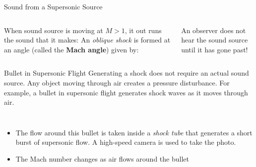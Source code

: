 \documentclass[12pt,compress,aspectratio=169]{beamer}
\begin{document}
\begin{frame}{Sound from a Supersonic Source}
  \begin{columns}
      
    When sound source is moving at $M>1$, it out runs the sound that it makes:
    An \emph{oblique shock} is formed at an angle (called the
    \textbf{Mach angle}) given by:
    

    An observer does not hear the sound source until it has gone past!
  \end{columns}
\end{frame}



\begin{frame}{Bullet in Supersonic Flight}
  Generating a shock does not require an actual sound source. Any object
  moving through air creates a pressure disturbance. For example, a bullet in
  supersonic flight generates shock waves as it moves through air.
  \begin{columns}
    \begin{itemize}
    \item The flow around this bullet is taken inside a \emph{shock tube} that
      generates a short burst of supersonic flow. A high-speed camera is used to
      take the photo.
    \item The Mach number changes as air flows around the bullet
    \end{itemize}

  \end{columns}
\end{frame}
\end{document}
